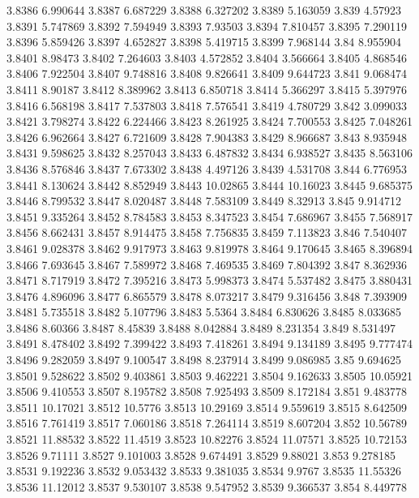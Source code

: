 3.8386  6.990644
3.8387  6.687229
3.8388  6.327202
3.8389  5.163059
3.839  4.57923
3.8391  5.747869
3.8392  7.594949
3.8393  7.93503
3.8394  7.810457
3.8395  7.290119
3.8396  5.859426
3.8397  4.652827
3.8398  5.419715
3.8399  7.968144
3.84  8.955904
3.8401  8.98473
3.8402  7.264603
3.8403  4.572852
3.8404  3.566664
3.8405  4.868546
3.8406  7.922504
3.8407  9.748816
3.8408  9.826641
3.8409  9.644723
3.841  9.068474
3.8411  8.90187
3.8412  8.389962
3.8413  6.850718
3.8414  5.366297
3.8415  5.397976
3.8416  6.568198
3.8417  7.537803
3.8418  7.576541
3.8419  4.780729
3.842  3.099033
3.8421  3.798274
3.8422  6.224466
3.8423  8.261925
3.8424  7.700553
3.8425  7.048261
3.8426  6.962664
3.8427  6.721609
3.8428  7.904383
3.8429  8.966687
3.843  8.935948
3.8431  9.598625
3.8432  8.257043
3.8433  6.487832
3.8434  6.938527
3.8435  8.563106
3.8436  8.576846
3.8437  7.673302
3.8438  4.497126
3.8439  4.531708
3.844  6.776953
3.8441  8.130624
3.8442  8.852949
3.8443  10.02865
3.8444  10.16023
3.8445  9.685375
3.8446  8.799532
3.8447  8.020487
3.8448  7.583109
3.8449  8.32913
3.845  9.914712
3.8451  9.335264
3.8452  8.784583
3.8453  8.347523
3.8454  7.686967
3.8455  7.568917
3.8456  8.662431
3.8457  8.914475
3.8458  7.756835
3.8459  7.113823
3.846  7.540407
3.8461  9.028378
3.8462  9.917973
3.8463  9.819978
3.8464  9.170645
3.8465  8.396894
3.8466  7.693645
3.8467  7.589972
3.8468  7.469535
3.8469  7.804392
3.847  8.362936
3.8471  8.717919
3.8472  7.395216
3.8473  5.998373
3.8474  5.537482
3.8475  3.880431
3.8476  4.896096
3.8477  6.865579
3.8478  8.073217
3.8479  9.316456
3.848  7.393909
3.8481  5.735518
3.8482  5.107796
3.8483  5.5364
3.8484  6.830626
3.8485  8.033685
3.8486  8.60366
3.8487  8.45839
3.8488  8.042884
3.8489  8.231354
3.849  8.531497
3.8491  8.478402
3.8492  7.399422
3.8493  7.418261
3.8494  9.134189
3.8495  9.777474
3.8496  9.282059
3.8497  9.100547
3.8498  8.237914
3.8499  9.086985
3.85  9.694625
3.8501  9.528622
3.8502  9.403861
3.8503  9.462221
3.8504  9.162633
3.8505  10.05921
3.8506  9.410553
3.8507  8.195782
3.8508  7.925493
3.8509  8.172184
3.851  9.483778
3.8511  10.17021
3.8512  10.5776
3.8513  10.29169
3.8514  9.559619
3.8515  8.642509
3.8516  7.761419
3.8517  7.060186
3.8518  7.264114
3.8519  8.607204
3.852  10.56789
3.8521  11.88532
3.8522  11.4519
3.8523  10.82276
3.8524  11.07571
3.8525  10.72153
3.8526  9.71111
3.8527  9.101003
3.8528  9.674491
3.8529  9.88021
3.853  9.278185
3.8531  9.192236
3.8532  9.053432
3.8533  9.381035
3.8534  9.9767
3.8535  11.55326
3.8536  11.12012
3.8537  9.530107
3.8538  9.547952
3.8539  9.366537
3.854  8.449778
